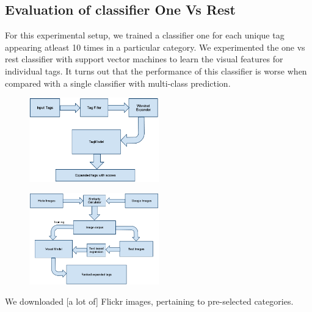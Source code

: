 \documentclass[12pt]{article}
\begin{document}
\subsection{Evaluation of classifier One Vs Rest}
For this experimental setup, we trained a classifier one for each unique tag appearing atleast
10 times in a particular category. We experimented the one vs rest classifier with support vector
machines to learn the visual features for individual tags. It turns out that the performance of
this classifier is worse when compared with a single classifier with multi-class prediction.


\begin{figure}[H]
\includegraphics[width=0.5\textwidth]{tagExpansion.png}
\end{figure}

\begin{figure}[H]
\includegraphics[width=0.5\textwidth]{model.png}
\end{figure}

We downloaded [a lot of] Flickr images, pertaining to pre-selected categories.
\end{document}
